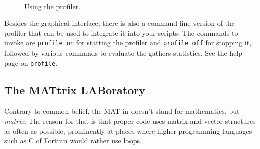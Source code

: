 \begin{figure}
\centering
{}\\
\caption{Using the profiler.}
\label{figure:profiler}
\end{figure}

\begin{remark}
Besides the graphical interface, there is also a command line version of the profiler that can be used to integrate it into your scripts. The commands to invoke are \lstinline!profile on! for starting the profiler and \lstinline!profile off! for stopping it, followed by various commands to evaluate the gathers statistics. See the \matlab{} help page on \lstinline!profile!.
\end{remark}


\subsection{The MATtrix LABoratory}

Contrary to common belief, the MAT in \matlab{} doesn't stand for mathematics, but \emph{matrix}. The reason for that is that proper \matlab{} code uses matrix and vector structures as often as possible, prominently at places where higher programming languages such as C of Fortran would rather use loops.

